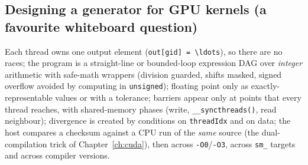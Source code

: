 \documentclass[10pt,a4paper,openany,oneside]{report}
\begin{document}
\subsection*{Designing a generator for GPU kernels (a favourite whiteboard question)}
Each thread owns one output element (\texttt{out[gid] = \textbackslash{}ldots}), so there are no races; the program is a straight-line or bounded-loop expression DAG over \emph{integer} arithmetic with safe-math wrappers (division guarded, shifts masked, signed overflow avoided by computing in \texttt{unsigned}); floating point only as exactly-representable values or with a tolerance; barriers appear only at points that every thread reaches, with shared-memory phases (write, \texttt{\_\_syncthreads()}, read neighbour); divergence is created by conditions on \texttt{threadIdx} and on data; the host compares a checksum against a CPU run of the \emph{same} source (the dual-compilation trick of Chapter~\ref{ch:cuda}), then across \texttt{-O0}/\texttt{-O3}, across \texttt{sm\_} targets and across compiler versions.
\end{document}
